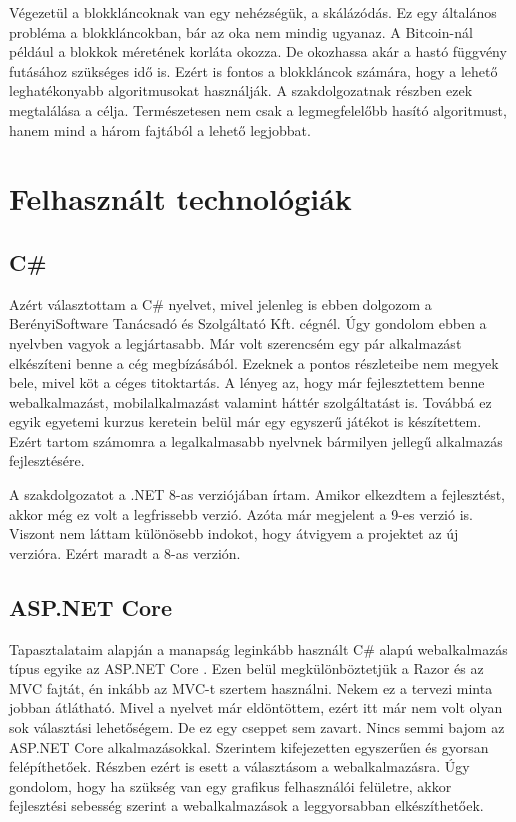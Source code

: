 \documentclass[12pt]{report} %
\begin{document}
Végezetül a blokkláncoknak van egy nehézségük, a skálázódás. Ez egy általános probléma a blokkláncokban, bár az oka nem mindig ugyanaz. A Bitcoin-nál például a blokkok méretének korláta okozza. De okozhassa akár a hastó függvény futásához szükséges idő is. Ezért is fontos a blokkláncok számára, hogy a lehető leghatékonyabb algoritmusokat használják. A szakdolgozatnak részben ezek megtalálása a célja. Természetesen nem csak a legmegfelelőbb hasító algoritmust, hanem mind a három fajtából a lehető legjobbat.

\chapter{Felhasznált technológiák} %

\section{C\#} %

Azért választottam a C\# \cite{cSharp} nyelvet, mivel jelenleg is ebben dolgozom a BerényiSoftware Tanácsadó és Szolgáltató Kft. cégnél. Úgy gondolom ebben a nyelvben vagyok a legjártasabb. Már volt szerencsém egy pár alkalmazást elkészíteni benne a cég megbízásából. Ezeknek a pontos részleteibe nem megyek bele, mivel köt a céges titoktartás. A lényeg az, hogy már fejlesztettem benne webalkalmazást, mobilalkalmazást valamint háttér szolgáltatást is. Továbbá ez egyik egyetemi kurzus keretein belül már egy egyszerű játékot is készítettem. Ezért tartom számomra a legalkalmasabb nyelvnek bármilyen jellegű alkalmazás fejlesztésére.

A szakdolgozatot a .NET 8-as verziójában írtam. Amikor elkezdtem a fejlesztést, akkor még ez volt a legfrissebb verzió. Azóta már megjelent a 9-es verzió is. Viszont nem láttam különösebb indokot, hogy átvigyem a projektet az új verzióra. Ezért maradt a 8-as verzión.

\section{ASP.NET Core} %

Tapasztalataim alapján a manapság leginkább használt C\# alapú webalkalmazás típus egyike az ASP.NET Core \cite{aspNetCore}. Ezen belül megkülönböztetjük a Razor és az MVC fajtát, én inkább az MVC-t szertem használni. Nekem ez a tervezi minta jobban átlátható. Mivel a nyelvet már eldöntöttem, ezért itt már nem volt olyan sok választási lehetőségem. De ez egy cseppet sem zavart. Nincs semmi bajom az ASP.NET Core alkalmazásokkal. Szerintem kifejezetten egyszerűen és gyorsan felépíthetőek. Részben ezért is esett a választásom a webalkalmazásra. Úgy gondolom, hogy ha szükség van egy grafikus felhasználói felületre, akkor fejlesztési sebesség szerint a webalkalmazások a leggyorsabban elkészíthetőek.
\end{document}
